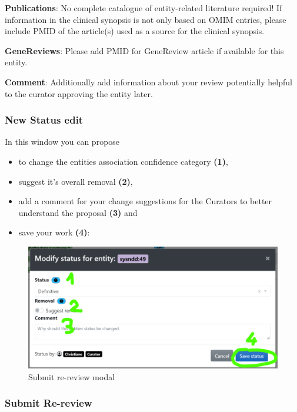 \documentclass[
]{article}
\providecommand{\tightlist}{%
  \setlength{\itemsep}{0pt}\setlength{\parskip}{0pt}}
\begin{document}
\textbf{Publications}: No complete catalogue of entity-related literature required! If information in the clinical synopsis is not only based on OMIM entries, please include PMID of the article(s) used as a source for the clinical synopsis.

\textbf{GeneReviews}: Please add PMID for GeneReview article if available for this entity.

\textbf{Comment}: Additionally add information about your review potentially helpful to the curator approving the entity later.

\hypertarget{new-status-edit}{%
\subsubsection{New Status edit}\label{new-status-edit}}

In this window you can propose

\begin{itemize}
\tightlist
\item
  to change the entities association confidence category \textbf{(1)},
\item
  suggest it's overall removal \textbf{(2)},
\item
  add a comment for your change suggestions for the Curators to better understand the proposal \textbf{(3)} and
\item
  save your work \textbf{(4)}:
\end{itemize}

\begin{figure}
\centering
\includegraphics{./static/img/modal_modify_status.png}
\caption{Submit re-review modal}
\end{figure}

\hypertarget{submit-re-review}{%
\subsubsection{Submit Re-review}\label{submit-re-review}}
\end{document}
